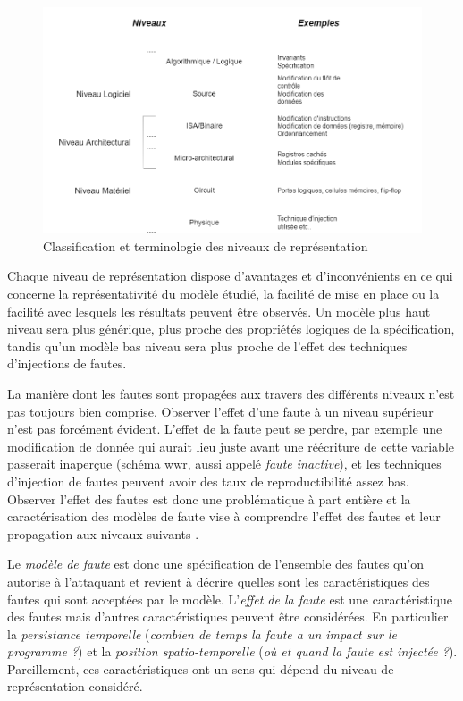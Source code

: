             \begin{figure}[ht]\centering
              \includegraphics[scale=.43]{ch2-background/img/Modeles all.drawio.png}
              \caption{Classification et terminologie des niveaux de représentation}
              \label{fig:abstraction-level}
            \end{figure}
            
            Chaque niveau de représentation dispose d'avantages et d'inconvénients en ce qui concerne la représentativité du modèle étudié, la facilité de mise en place ou la facilité avec lesquels les résultats peuvent être observés. Un modèle plus haut niveau sera plus générique, plus proche des propriétés logiques de la spécification, tandis qu'un modèle bas niveau sera plus proche de l'effet des techniques d'injections de fautes.   
        
            La manière dont les fautes sont propagées aux travers des différents niveaux n'est pas toujours bien comprise. 
            Observer l'effet d'une faute à un niveau supérieur n'est pas forcément évident.
            L'effet de la faute peut se perdre, par exemple une modification de donnée qui aurait lieu juste avant une réécriture de cette variable passerait inaperçue (schéma \gls{wwr}, aussi appelé \textit{faute inactive}), et les techniques d'injection de fautes peuvent avoir des taux de reproductibilité assez bas.
            Observer l'effet des fautes est donc une problématique à part entière et la caractérisation des modèles de faute vise à comprendre l'effet des fautes et leur propagation aux niveaux suivants \cite{Balasch/FDTC11, Dureuil/CARDIS15, werner2020end}.             
            
            Le \textit{modèle de faute} est donc une spécification de l'ensemble des fautes qu'on autorise à l'attaquant et revient à décrire quelles sont les caractéristiques des fautes qui sont acceptées par le modèle.
            L'\textit{effet de la faute} est une caractéristique des fautes mais d'autres caractéristiques peuvent être considérées. En particulier la \textit{persistance temporelle} (\textit{combien de temps la faute a un impact sur le programme ?}) et la \textit{position spatio-temporelle} (\textit{où et quand la faute est injectée ?}). Pareillement, ces caractéristiques ont un sens qui dépend du niveau de représentation considéré.
            
